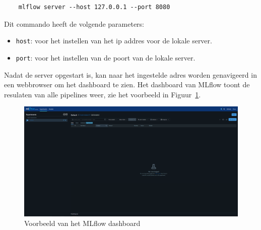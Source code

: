 \begin{verbatim}
    mlflow server --host 127.0.0.1 --port 8080
\end{verbatim}

Dit commando heeft de volgende parameters:

\begin{itemize}
    \item \texttt{host}: voor het instellen van het ip addres voor de lokale server.
    \item \texttt{port}: voor het instellen van de poort van de lokale server.
\end{itemize}

Nadat de server opgestart is, kan naar het ingestelde adres worden genavigeerd in een webbrowser om het dashboard te zien. Het dashboard van MLflow toont de resulaten van alle pipelines weer, zie het voorbeeld in Figuur~\ref{fig:mlflow_dashboard}.

\begin{figure}
    \centering
    \includegraphics[width=0.9\linewidth]{graphics/mlflow_dashboard.PNG}
    \caption{Voorbeeld van het MLflow dashboard}
    \label{fig:mlflow_dashboard}
\end{figure}